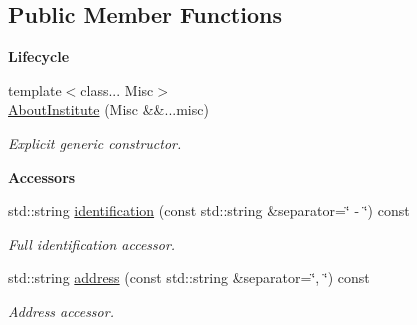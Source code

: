 \subsection*{Public Member Functions}
\begin{Indent}{\bf Lifecycle}\par
\begin{DoxyCompactItemize}
\item 
{\footnotesize template$<$class... Misc$>$ }\\\hyperlink{exceptionmagrathea_1_1AboutInstitute_a6061c494364804af9f338f5bd8645f0a}{About\-Institute} (Misc \&\&...misc)
\begin{DoxyCompactList}\small\item\em Explicit generic constructor. \end{DoxyCompactList}\end{DoxyCompactItemize}
\end{Indent}
\begin{Indent}{\bf Accessors}\par
\begin{DoxyCompactItemize}
\item 
std\-::string \hyperlink{exceptionmagrathea_1_1AboutInstitute_a58163e5c1a1cafe2d50bd2e43b720a1a}{identification} (const std\-::string \&separator=\char`\"{} -\/ \char`\"{}) const 
\begin{DoxyCompactList}\small\item\em Full identification accessor. \end{DoxyCompactList}\item 
std\-::string \hyperlink{exceptionmagrathea_1_1AboutInstitute_a9cccc4d8963a6e02e09e52c2941fba30}{address} (const std\-::string \&separator=\char`\"{}, \char`\"{}) const 
\begin{DoxyCompactList}\small\item\em Address accessor. \end{DoxyCompactList}\end{DoxyCompactItemize}
\end{Indent}
